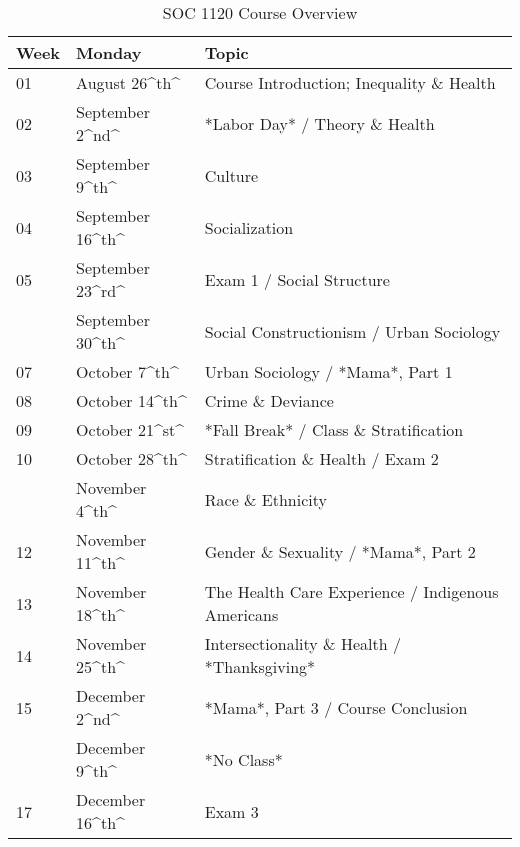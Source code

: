 \documentclass[]{book}
\begin{document}
\begin{table}[t]

\caption{\label{tab:unnamed-chunk-1}SOC 1120 Course Overview}
\centering
\begin{tabular}{lll}
\toprule
Week & Monday & Topic\\
\midrule
01 & August 26\textasciicircum{}th\textasciicircum{} & Course Introduction; Inequality \& Health\\
02 & September 2\textasciicircum{}nd\textasciicircum{} & *Labor Day* / Theory \& Health\\
03 & September 9\textasciicircum{}th\textasciicircum{} & Culture\\
04 & September 16\textasciicircum{}th\textasciicircum{} & Socialization\\
05 & September 23\textasciicircum{}rd\textasciicircum{} & Exam 1 / Social Structure\\
\addlinespace
06 & September 30\textasciicircum{}th\textasciicircum{} & Social Constructionism / Urban Sociology\\
07 & October 7\textasciicircum{}th\textasciicircum{} & Urban Sociology / *Mama*, Part 1\\
08 & October 14\textasciicircum{}th\textasciicircum{} & Crime \& Deviance\\
09 & October 21\textasciicircum{}st\textasciicircum{} & *Fall Break* / Class \& Stratification\\
10 & October 28\textasciicircum{}th\textasciicircum{} & Stratification \& Health / Exam 2\\
\addlinespace
11 & November 4\textasciicircum{}th\textasciicircum{} & Race \& Ethnicity\\
12 & November 11\textasciicircum{}th\textasciicircum{} & Gender \& Sexuality / *Mama*, Part 2\\
13 & November 18\textasciicircum{}th\textasciicircum{} & The Health Care Experience / Indigenous Americans\\
14 & November 25\textasciicircum{}th\textasciicircum{} & Intersectionality \& Health / *Thanksgiving*\\
15 & December 2\textasciicircum{}nd\textasciicircum{} & *Mama*, Part 3 / Course Conclusion\\
\addlinespace
16 & December 9\textasciicircum{}th\textasciicircum{} & *No Class*\\
17 & December 16\textasciicircum{}th\textasciicircum{} & Exam 3\\
\bottomrule
\end{tabular}
\end{table}
\end{document}
